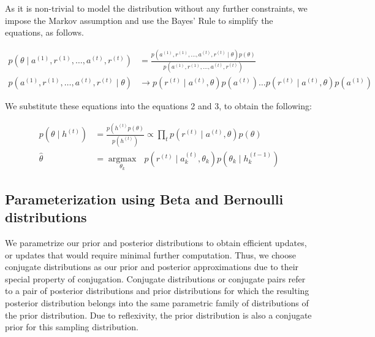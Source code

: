 \documentclass[11pt]{article}
\begin{document}
As it is non-trivial to model the distribution without any further constraints, we impose the Markov assumption and use the Bayes' Rule to simplify the equations, as follows.

\begin{align}
p\left(\theta \mid a^{(1)}, r^{(1)}, \ldots, a^{(t)}, r^{(t)}\right) &=\frac{p\left(a^{(1)}, r^{(1)}, \ldots, a^{(t)}, r^{(t)} \mid \theta\right) p(\theta)}{p\left(a^{(1)}, r^{(1)}, \ldots, a^{(t)}, r^{(t)}\right)} \\
p\left(a^{(1)}, r^{(1)}, \ldots, a^{(t)}, r^{(t)} \mid \theta\right) &\rightarrow p\left(r^{(t)} \mid a^{(t)}, \theta\right) p\left(a^{(t)}\right) \ldots p\left(r^{(t)} \mid a^{(t)}, \theta\right) p\left(a^{(1)}\right)
\end{align}

We substitute these equations into the equations 2 and 3, to obtain the following:

\begin{align}
p\left(\theta \mid h^{(t)}\right) &=\frac{p\left(h^{(t)} p(\theta)\right.}{p\left(h^{(t)}\right)} \propto \prod_{t} p\left(r^{(t)} \mid a^{(t)}, \theta\right) p(\theta) \\
\hat{\theta} &=\underset{\theta_{k}}{\operatorname{argmax}} \text{ } p\left(r^{(t)} \mid a_{k}^{(t)}, \theta_{k}\right) p\left(\theta_{k} \mid h_{k}^{(t-1)}\right)
\end{align}



\subsection{Parameterization using Beta and Bernoulli distributions}

We parametrize our prior and posterior distributions to obtain efficient updates, or updates that would require minimal further computation. Thus, we choose conjugate distributions as our prior and posterior approximations due to their special property of conjugation. Conjugate distributions or conjugate pairs refer to a pair of posterior distributions and prior distributions for which the resulting posterior distribution belongs into the same parametric family of distributions of the prior distribution. Due to reflexivity, the prior distribution is also a conjugate prior for this sampling distribution.
\end{document}
